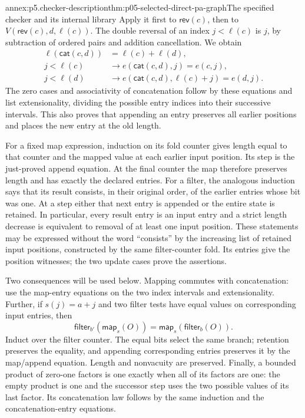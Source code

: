\begin{annexitem}{annex:p5.checker-description}{thm:p05-selected-direct-pa-graph}{The specified checker and its internal library}
Apply it first to \(\mathsf{rev}(c)\), then to
\(V(\mathsf{rev}(c),d,\ell(c))\).  The double reversal of an index
\(j<\ell(c)\) is \(j\), by subtraction of ordered pairs and addition
cancellation.  We obtain
\[
\begin{aligned}
 \ell(\mathsf{cat}(c,d))&=\ell(c)+\ell(d),\\
 j<\ell(c)&\to e(\mathsf{cat}(c,d),j)=e(c,j),\\
 j<\ell(d)&\to e(\mathsf{cat}(c,d),\ell(c)+j)=e(d,j).
\end{aligned}
\]
The zero cases and associativity of concatenation follow by these equations
and list extensionality, dividing the possible entry indices into their
successive intervals.  This also proves that appending an entry preserves
all earlier positions and places the new entry at the old length.

For a fixed map expression, induction on its fold counter gives length equal
to that counter and the mapped value at each earlier input position.  Its
step is the just-proved append equation.  At the final counter the map
therefore preserves length and has exactly the declared entries.  For a
filter, the analogous induction says that its result consists, in their
original order, of the earlier entries whose bit was one.  At a step either
that next entry is appended or the entire state is retained.  In particular,
every result entry is an input entry and a strict length decrease is
equivalent to removal of at least one input position.  These statements may
be expressed without the word ``consists'' by the increasing list of retained
input positions, constructed by the same filter-counter fold.  Its entries
give the position witnesses; the two update cases prove the assertions.

Two consequences will be used below.  Mapping commutes with concatenation:
use the map-entry equations on the two index intervals and extensionality.
Further, if \(s(j)=a+j\) and two filter tests have equal values on
corresponding input entries, then
\[
 \mathsf{filter}_{b'}(\mathsf{map}_s(O))
       =\mathsf{map}_s(\mathsf{filter}_b(O)).
\]
Induct over the filter counter.  The equal bits select the same branch;
retention preserves the equality, and appending corresponding entries
preserves it by the map/append equation.  Length and nonvacuity are preserved.
Finally, a bounded product of zero-one factors is one exactly when all of
its factors are one: the empty product is one and the successor step uses
the two possible values of its last factor.  Its concatenation law follows
by the same induction and the concatenation-entry equations.


\end{annexitem}
